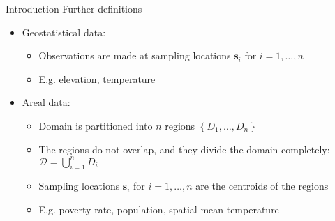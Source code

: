 \documentclass[12pt,t,handout]{beamer}
\newcommand{\subt}[1]{{\footnotesize \color{subtitle} {#1}}}
\begin{document}
\begin{frame}{Introduction}
\subt{Further definitions}

\bigskip
\begin{itemize}
    \item Geostatistical data:
    \begin{itemize}
        \item Observations are made at sampling locations $\bm{s}_i$ for $i = 1, \dots, n$
        \item E.g. elevation, temperature
    \end{itemize}
    \item Areal data:
    \begin{itemize}
        \item Domain is partitioned into $n$ regions $\left\{ D_1, \dots, D_n \right\}$
        \item The regions do not overlap, and they divide the domain completely: $\mathcal{D} = \bigcup_{i=1}^n D_i$
        \item Sampling locations $\bm{s}_i$ for $i = 1, \dots, n$ are the centroids of the regions
        \item E.g. poverty rate, population, spatial mean temperature
    \end{itemize}
\end{itemize}


\end{frame}
\end{document}
